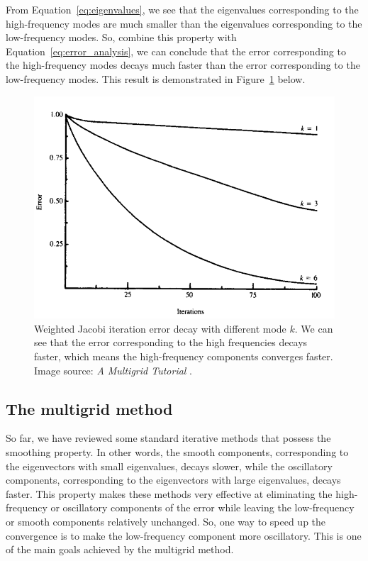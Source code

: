 \documentclass[letterpaper,12pt]{article}
\begin{document}
From Equation~\eqref{eq:eigenvalues}, we see that the eigenvalues corresponding to the high-frequency modes are much smaller than the eigenvalues corresponding to the low-frequency modes. So, combine this property with Equation~\eqref{eq:error_analysis}, we can conclude that the error corresponding to the high-frequency modes decays much faster than the error corresponding to the low-frequency modes. This result is demonstrated in Figure~\ref{fig:1} below.
\begin{figure}[H]
\centering
\includegraphics[scale=0.7]{a.png}
\caption{Weighted Jacobi iteration error decay with different mode $k$. We can see that the error corresponding to the high frequencies decays faster, which means the high-frequency components converges faster. Image source: \textit{A Multigrid Tutorial} \cite[page 14]{10.5555/357695}.}\label{fig:1}
\end{figure}




\subsection{The multigrid method}
So far, we have reviewed some standard iterative methods that possess the smoothing property. In other words, the smooth components, corresponding to the eigenvectors with small eigenvalues, decays slower, while the oscillatory components, corresponding to the eigenvectors with large eigenvalues, decays faster. This property makes these methods very effective at eliminating the high-frequency or oscillatory components of the error while leaving the low-frequency or smooth components relatively unchanged. So, one way to speed up the convergence is to make the low-frequency component more oscillatory. This is one of the main goals achieved by the multigrid method.
\end{document}
